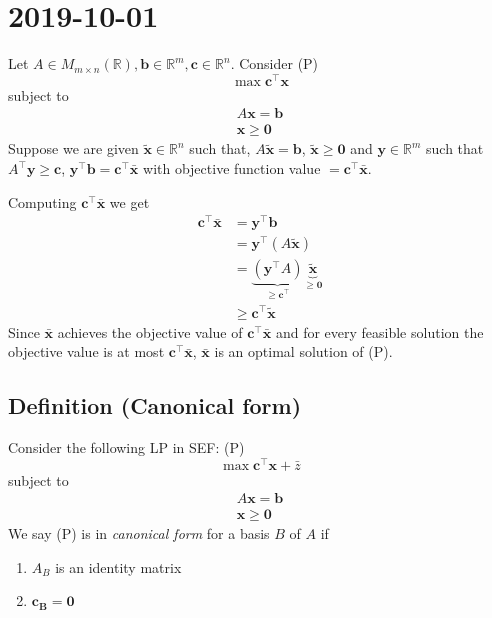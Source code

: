 \section{2019-10-01}
Let $A\in M_{m\times n}(\mathbb{R}), \mathbf{b}\in\mathbb{R}^m, \mathbf{c}\in\mathbb{R}^n$.
Consider (P)
\[\max \mathbf{c}^\top \mathbf{x}\]
subject to
\begin{align*}
    A\mathbf{x}=\mathbf{b}\\
    \mathbf{x}\ge\mathbf{0}
\end{align*}
Suppose we are given
$\mathbf{\tilde{x}}\in\mathbb{R}^n$ such that, $A\mathbf{\tilde{x}}=\mathbf{b}$,
$\mathbf{\tilde{x}}\ge\mathbf{0}$
and
$\mathbf{y}\in\mathbb{R}^m$ such that $A^\top \mathbf{y}\ge\mathbf{c}$,
$\mathbf{y}^\top \mathbf{b}=\mathbf{c}^\top \mathbf{\bar{x}}$ with objective function
value $=\mathbf{c}^\top \mathbf{\bar{x}}$.


Computing $\mathbf{c}^\top \mathbf{\bar{x}}$ we get
\begin{align*}
    \mathbf{c}^\top \mathbf{\bar{x}}&=\mathbf{y}^\top \mathbf{b}\\
    &=\mathbf{y}^\top (A\mathbf{\tilde{x}})\\
    &=
    \underbrace{(\mathbf{y}^\top A)}_{\ge \mathbf{c}^\top }
    \underbrace{\mathbf{\tilde{x}}}_{\ge \mathbf{0}}\\
    &\ge \mathbf{c}^\top \mathbf{\tilde{x}}
\end{align*}
Since $\mathbf{\bar{x}}$ achieves the objective value of 
$\mathbf{c}^\top \mathbf{\bar{x}}$ and for every feasible solution the objective
value is at most $\mathbf{c}^\top \mathbf{\bar{x}}$, $\mathbf{\bar{x}}$ is an
optimal solution of (P).


\begin{defbox}
    \subsection{Definition (Canonical form)}
    Consider the following LP in SEF: (P)
    \[\max \mathbf{c}^\top  \mathbf{x}+\bar{z}\]
    subject to
    \begin{align*}
        A\mathbf{x}=\mathbf{b}\\
        \mathbf{x}\ge \mathbf{0}
    \end{align*}
    We say (P) is in \emph{canonical form} for a basis $B$ of $A$ if
    \begin{enumerate}[(C1)]
        \item $A_B$ is an identity matrix
        \item $\mathbf{c_B}=\mathbf{0}$
    \end{enumerate}
\end{defbox}

